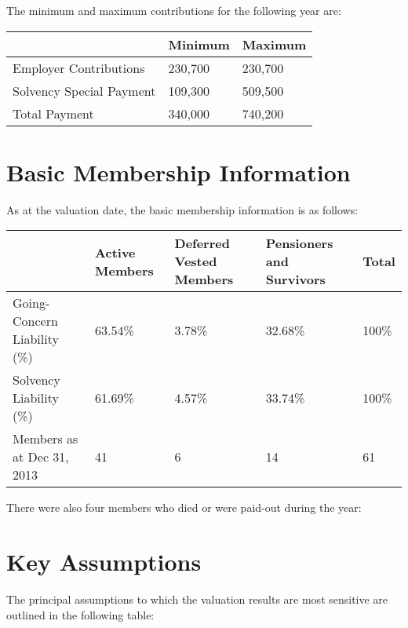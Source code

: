 \documentclass{report}
\begin{document}
\vspace{3mm}
The minimum and maximum contributions for the following year are:

\begin{table}[ht]
\bgroup
\def\arraystretch{1.5}
\begin{tabular}{p{6cm} p{3cm} p{3cm}}
\hline
 & \textbf{Minimum} &  \textbf{Maximum} \\ \hline
Employer Contributions & 230,700 & 230,700 \\ \hline
Solvency Special Payment & 109,300 & 509,500 \\ \hline
Total Payment & 340,000 & 740,200 \\ \hline
\end{tabular}
\egroup
\end{table}

\pagebreak
\section{Basic Membership Information}

As at the valuation date, the basic membership information is as follows:

\begin{table}[ht]
\bgroup
\def\arraystretch{1.5}
\begin{tabular}{p{5.2cm} p{1.8cm} p{2.5cm} p{2.2cm} p{2.2cm}}
\hline
& Active Members & Deferred Vested Members & Pensioners and Survivors & Total \\ \hline
Going-Concern Liability (\%) & 63.54\% & 3.78\% & 32.68\% & 100\% \\ \hline 
Solvency Liability (\%) &  61.69\% & 4.57\% & 33.74\% & 100\% \\ \hline
Members as at Dec 31, 2013 & 41 & 6 & 14 & 61 \\ \hline 
\end{tabular}
\egroup
\end{table}

There were also four members who died or were paid-out during the year:

\section{Key Assumptions}
The principal assumptions to which the valuation results are most sensitive are outlined in the following table:
\end{document}
